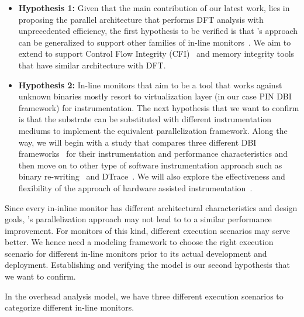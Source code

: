%
%
\begin{itemize}
\item {\bf Hypothesis 1:} Given that the main contribution of our latest work,
\sreplica lies in proposing the parallel architecture that performs DFT
analysis with unprecedented efficiency, the first hypothesis to be verified is
that \sreplica's approach can be generalized to support other families of
in-line monitors~\cite{cab:oopsala2009}. We aim to extend \sreplica to support
Control Flow Integrity (CFI)~\cite{cfi:ccs2005} and memory integrity
tools~\cite{drmemory:cgo2011, memcheck} that have similar architecture with
DFT.

\item {\bf Hypothesis 2:} In-line monitors that aim to be a tool that works against
unknown binaries mostly resort to virtualization layer (in our case PIN DBI
framework) for instrumentation. The next hypothesis that we want to confirm is
that the substrate can be substituted with different instrumentation mediums to
implement the equivalent parallelization framework. Along the way, we will
begin with a study that compares three different DBI
frameworks~\cite{pin:pldi2005, dynamorio, valgrind} for their instrumentation
and performance characteristics and then move on to other type of software
instrumentation approach such as binary re-writing~\cite{brewriting:usenix2003}
and DTrace~\cite{DTrace}. We will also explore the effectiveness and
flexibility of the approach of hardware assisted
instrumentation~\cite{lba:isca2008, raksha:isca2007}.
\end{itemize}

Since every in-inline monitor has different architectural characteristics and
design goals, \sreplica's parallelization approach may not lead to to a similar
performance improvement. For monitors of this kind, different execution
scenarios may serve better. We hence need a modeling framework to choose the
right execution scenario for different in-line monitors prior to its actual
development and deployment.  Establishing and verifying the model is our second
hypothesis that we want to confirm.

In the overhead analysis model, we have three different execution scenarios to
categorize different in-line monitors. 

